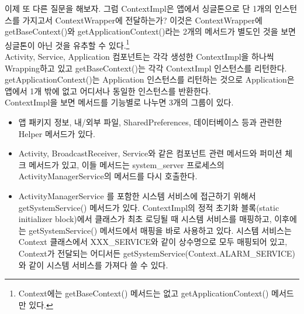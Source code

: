 이제 또 다른 질문을 해보자. 그럼 ContextImpl은 앱에서 싱글톤으로 단 1개의 인스턴스를 가지고서 ContextWrapper에 전달하는가?
이것은 ContextWrapper에 getBaseContext()와 getApplicationContext()라는 2개의 메서드가 별도인 것을 보면 싱글톤이 아닌 것을 유추할 수 있다.\footnote{Context에는 getBaseContext() 메서드는 없고 getApplicationContext() 메서드만 있다.}\\

Activity, Service, Application 컴포넌트는 각각 생성한 ContextImpl을 하나씩 Wrapping하고 있고 getBaseContext()는 각각 ContextImpl 인스턴스를 리턴한다. getApplicationContext()는 Application 인스턴스를 리턴하는 것으로 Application은 앱에서 1개 밖에 없고 어디서나 동일한 인스턴스를 반환한다.\\

ContextImpl을 보면 메서드를 기능별로 나누면 3개의 그룹이 있다.
\begin{itemize}
\item 앱 패키지 정보, 내/외부 파일, SharedPreferences, 데이터베이스 등과 관련한 Helper 메서드가 있다. 

\item Activity, BroadcastReceiver, Service와 같은 컴포넌트 관련 메서드와 퍼미션 체크 메서드가 있고, 이들 메서드는 system\_server 프로세스의 ActivityManagerService의 메서드를 다시 호출한다. 

\item ActivityManagerService 를 포함한 시스템 서비스에 접근하기 위해서 getSystemService() 메서드가 있다. 
ContextImpl의 정적 초기화 블록(static initializer block)에서 클래스가 최초 로딩될 때 시스템 서비스를 매핑하고, 이후에는 getSystemService() 메서드에서 매핑을 바로 사용하고 있다.
시스템 서비스는 Context 클래스에서 XXX\_SERVICE와 같이 상수명으로 모두 매핑되어 있고, Context가 전달되는 어디서든 getSystemService(Context.ALARM\_SERVICE)와 같이 시스템 서비스를 가져다 쓸 수 있다.
\end{itemize}

